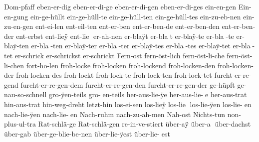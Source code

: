 {  Dom-pfaff %
  eben-er-dig %
  eben-er-di-ge %
  eben-er-di-gen %
  eben-er-di-ges %
  ein-en-gen %
  Ein-en-gung %
  ein-ge-h^^fcllt %
  ein-ge-h^^fcll-te %
  ein-ge-h^^fcll-ten %
  ein-ge-h^^fcll-tes %
  ein-zu-eb-nen %
  ein-zu-en-gen %
  ent-ei-len %
  ent-eil-ten %
  ent-er-ben %
  ent-er-ben-de %
  ent-er-ben-den %
  ent-er-ben-der %
  ent-erbst %
  ent-lie^^ff %
  ent-lie^^Y
  er-ah-nen %
  er-bla^^fft %
  er-bla^^Yt
  er-bla^^ff-te %
  er-bla^^Y-te
  er-bla^^ff-ten %
  er-bla^^Y-ten
  er-bla^^ff-ter %
  er-bla^^Y-ter
  er-bla^^ff-tes %
  er-bla^^Y-tes
  er-bla^^ff-tet %
  er-bla^^Y-tet
  er-schrick %
  er-schrickst %
  er-schrickt %
  Fern-ost %
  fern-^^f6st-lich %
  fern-^^f6st-li-che %
  fern-^^f6st-li-chen %
  fort-ho-len %
  froh-locke %
  froh-locken %
  froh-lockend %
  froh-locken-den %
  froh-locken-der %
  froh-locken-des %
  froh-lockt %
  froh-lock-te %
  froh-lock-ten %
  froh-lock-tet %
  furcht-er-re-gend %
  furcht-er-re-gen-dem %
  furcht-er-re-gen-den %
  furcht-er-re-gen-der %
  ge-h^^fcpft %
  ge-nau-so-schnell %
  gro-^^ffen-teils %
  gro-^^Yen-teils
  her-aus-lie-^^ffe %
  her-aus-lie-^^Ye
  her-aus-trat %
  hin-aus-trat %
  hin-weg-dreht %
  letzt-hin %
  los-ei-sen %
  los-lie^^ff %
  los-lie^^Y
  los-lie-^^ffen %
  los-lie-^^Yen
  nach-lie-^^ffen %
  nach-lie-^^Yen
  Nach-ruhm %
  nach-zu-ah-men %
  Nah-ost %
  Nichts-tun %
  non-plus-ul-tra %
  Rat-schl^^e4-ge %
  Rat-schl^^e4-gen %
  re-in-ve-stiert %
  ^^fcber-a^^ff %
  ^^fcber-a^^Y
  ^^fcber-dachst %
  ^^fcber-gab %
  ^^fcber-ge-blie-be-nen %
  ^^fcber-lie-^^ffest %
  ^^fcber-lie-^^Yest
}
